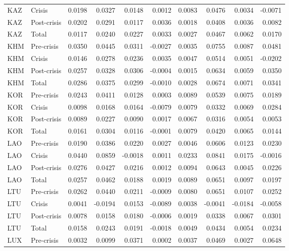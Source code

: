 \begin{longtable}[t]{llrrrrrrrr}
KAZ & Crisis & 0.0198 & 0.0327 & 0.0148 & 0.0012 & 0.0083 & 0.0476 & 0.0034 & -0.0071\\
KAZ & Post-crisis & 0.0202 & 0.0291 & 0.0117 & 0.0036 & 0.0018 & 0.0408 & 0.0036 & 0.0082\\
KAZ & Total & 0.0117 & 0.0240 & 0.0227 & 0.0033 & 0.0027 & 0.0467 & 0.0062 & 0.0170\\
\addlinespace
KHM & Pre-crisis & 0.0350 & 0.0445 & 0.0311 & -0.0027 & 0.0035 & 0.0755 & 0.0087 & 0.0481\\
KHM & Crisis & 0.0146 & 0.0278 & 0.0236 & 0.0035 & 0.0047 & 0.0514 & 0.0051 & -0.0202\\
KHM & Post-crisis & 0.0257 & 0.0328 & 0.0306 & -0.0004 & 0.0015 & 0.0634 & 0.0059 & 0.0350\\
KHM & Total & 0.0286 & 0.0375 & 0.0299 & -0.0010 & 0.0028 & 0.0674 & 0.0071 & 0.0341\\
KOR & Pre-crisis & 0.0243 & 0.0411 & 0.0128 & 0.0003 & 0.0089 & 0.0539 & 0.0075 & 0.0189\\
\addlinespace
KOR & Crisis & 0.0098 & 0.0168 & 0.0164 & -0.0079 & 0.0079 & 0.0332 & 0.0069 & 0.0284\\
KOR & Post-crisis & 0.0089 & 0.0227 & 0.0090 & 0.0017 & 0.0067 & 0.0316 & 0.0054 & 0.0053\\
KOR & Total & 0.0161 & 0.0304 & 0.0116 & -0.0001 & 0.0079 & 0.0420 & 0.0065 & 0.0144\\
LAO & Pre-crisis & 0.0190 & 0.0386 & 0.0220 & 0.0027 & 0.0046 & 0.0606 & 0.0123 & 0.0230\\
LAO & Crisis & 0.0440 & 0.0859 & -0.0018 & 0.0011 & 0.0233 & 0.0841 & 0.0175 & -0.0016\\
\addlinespace
LAO & Post-crisis & 0.0276 & 0.0427 & 0.0216 & 0.0012 & 0.0094 & 0.0643 & 0.0045 & 0.0226\\
LAO & Total & 0.0257 & 0.0462 & 0.0188 & 0.0019 & 0.0089 & 0.0651 & 0.0097 & 0.0197\\
LTU & Pre-crisis & 0.0262 & 0.0440 & 0.0211 & -0.0009 & 0.0080 & 0.0651 & 0.0107 & 0.0252\\
LTU & Crisis & 0.0041 & -0.0194 & 0.0153 & -0.0089 & 0.0038 & -0.0041 & -0.0184 & -0.0058\\
LTU & Post-crisis & 0.0078 & 0.0158 & 0.0180 & -0.0006 & 0.0019 & 0.0338 & 0.0067 & 0.0301\\
\addlinespace
LTU & Total & 0.0158 & 0.0243 & 0.0191 & -0.0018 & 0.0049 & 0.0434 & 0.0054 & 0.0234\\
LUX & Pre-crisis & 0.0032 & 0.0099 & 0.0371 & 0.0002 & 0.0037 & 0.0469 & 0.0027 & 0.0648\\

\end{longtable}
